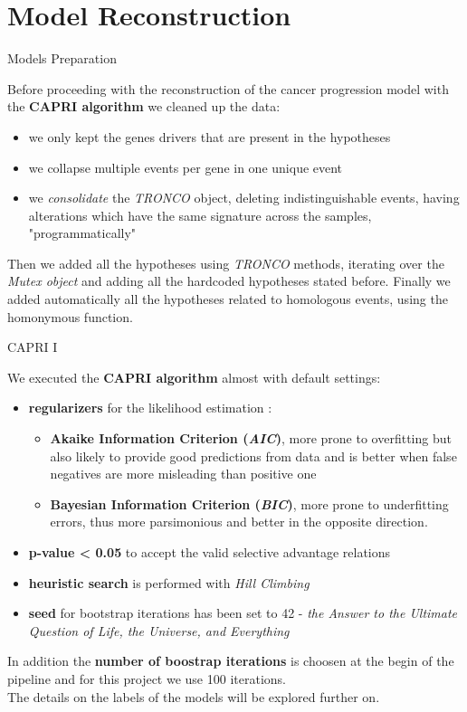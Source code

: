 \documentclass{beamer}
\begin{document}
\section{Model Reconstruction}
\begin{frame}{Models Preparation}
  \begin{block}{}
    Before proceeding with the reconstruction of the cancer progression model with the \textbf{CAPRI algorithm} we cleaned up the data:
    \begin{itemize}
      \item we only kept the genes drivers that are present in the hypotheses
      \item we collapse multiple events per gene in one unique event
      \item we \textit{consolidate} the \textit{TRONCO} object, deleting indistinguishable events, having alterations which have the same signature across the samples, "programmatically"
    \end{itemize}
  \end{block}
  \pause
  \begin{block}{}
    Then we added all the hypotheses using \textit{TRONCO} methods, iterating over the \textit{Mutex object} and adding all the hardcoded hypotheses stated before. Finally we added automatically all the hypotheses related to homologous events, using the homonymous function.
  \end{block}
\end{frame}
\begin{frame}{CAPRI I}
  \begin{block}{}
  \small
    We executed the \textbf{CAPRI algorithm} \cite{capri} almost with default settings:
    \begin{itemize}
      \item \textbf{regularizers} for the likelihood estimation \cite{picnic}:
      \begin{itemize}
        \item \textbf{Akaike Information Criterion (\textit{AIC})}, more prone to overfitting but also likely to provide good predictions from data and is better when false negatives are more misleading than positive one
        \item \textbf{Bayesian Information Criterion (\textit{BIC})}, more prone to underfitting
        errors, thus more parsimonious and better in the opposite direction.
      \end{itemize}
      \item \textbf{p-value < 0.05} to accept the valid selective advantage relations
      \item \textbf{heuristic search} is performed with \textit{Hill Climbing}
      \item \textbf{seed} for bootstrap iterations has been set to 42 -  \textit{the Answer to the Ultimate Question of Life, the Universe, and Everything}
    \end{itemize}
    In addition the \textbf{number of boostrap iterations} is choosen at the begin of the pipeline and for this project we use 100 iterations.\\
    The details on the labels of the models will be explored further on.
  \end{block}
\end{frame}
\end{document}
